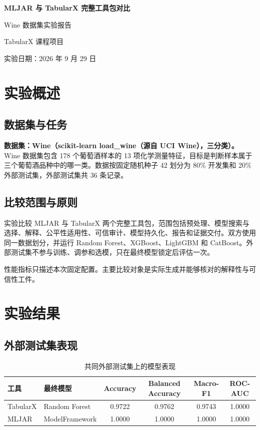 \documentclass[degree=bachelor,language=chinese,fontset=fandol]{thuthesis}
\begin{document}
\begin{titlepage}
  \centering
  \vspace*{2.3cm}
  {\bfseries MLJAR 与 TabularX 完整工具包对比\par}
  \vspace{1.2cm}
  {Wine 数据集实验报告\par}
  \vspace{2.2cm}
  {TabularX 课程项目\par}
  \vfill
  {实验日期：2026 年 9 月 29 日\par}
  \vspace{1.2cm}
\end{titlepage}

\frontmatter
\tableofcontents
\mainmatter
\chapter{实验概述}
\section{数据集与任务}
\textbf{数据集：Wine（scikit-learn load\_wine（源自 UCI Wine），三分类）。}
Wine 数据集包含 178 个葡萄酒样本的 13 项化学测量特征，目标是判断样本属于三个葡萄酒品种中的哪一类。数据按固定随机种子 42 划分为 80\% 开发集和 20\% 外部测试集，外部测试集共 36 条记录。

\section{比较范围与原则}
实验比较 MLJAR 与 TabularX 两个完整工具包，范围包括预处理、模型搜索与选择、解释、公平性适用性、可信审计、模型持久化、报告和证据交付。双方使用同一数据划分，并运行 Random Forest、XGBoost、LightGBM 和 CatBoost。外部测试集不参与训练、调参和选模，只在最终模型锁定后评估一次。

性能指标只描述本次固定配置。主要比较对象是实际生成并能够核对的解释性与可信性工件。

\chapter{实验结果}
\section{外部测试集表现}
\begin{table}[htbp]
  \centering
  \small
  \caption{共同外部测试集上的模型表现}
  \begin{tabular}{llcccc}
    \toprule
    工具 & 最终模型 & Accuracy & Balanced Accuracy & Macro-F1 & ROC-AUC \\
    \midrule
    TabularX & Random Forest & 0.9722 & 0.9762 & 0.9743 & 1.0000 \\
    MLJAR & ModelFramework & 1.0000 & 1.0000 & 1.0000 & 1.0000 \\
    \bottomrule
  \end{tabular}
\end{table}
\end{document}
